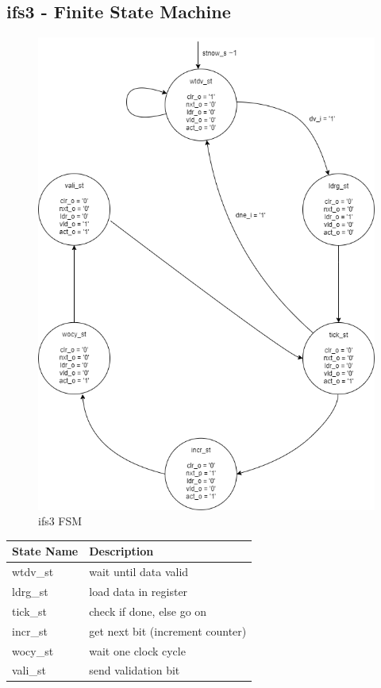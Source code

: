 \documentclass[12pt,a4 paper] {report}
\begin{document}
\newpage

\subsection*{ifs3 - Finite State Machine}
\begin{figure}[h]
	\centering	
	\includegraphics[scale=0.5]{../png/ifs3.png}
	\caption{ifs3 FSM}
\end{figure}
\begin{center}
 \begin{tabular}{| p{4cm} | p{7cm} |}
	 \hline
	 \textbf{State Name} & \textbf{Description} \\
	 \hline
	 wtdv\_st & wait until data valid \\
	 \hline
	 ldrg\_st & load data in register \\
	 \hline
	 tick\_st & check if done, else go on \\
	 \hline
	 incr\_st & get next bit (increment counter) \\
	 \hline
	 wocy\_st & wait one clock cycle \\
	 \hline
	 vali\_st & send validation bit \\
	 \hline
 \end{tabular}
\end{center}
\end{document}
